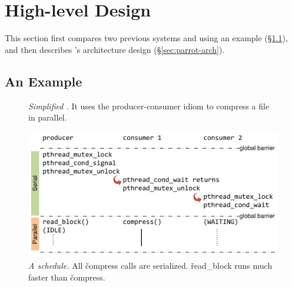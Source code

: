 \section{High-level Design} \label{sec:parrot-design}

This section first compares two previous systems and \parrot using
an example (\S\ref{sec:parrot-example}), and then describes \parrot's architecture design
(\S\ref{sec:parrot-arch}).

\subsection{An Example} \label{sec:parrot-example}

\begin{figure}[!ht]
\vspace{-.1in}
\centering
\begin{minipage}{.5\linewidth}
\tiny {}
\end{minipage}
\vspace{-.1in}
\caption{{\em Simplified \pbzip.} It uses the producer-consumer idiom to
  compress a file in parallel.} \label{fig:parrot-example}
\vspace{-.05in}
\end{figure}

\begin{figure}[t]
\centering
\includegraphics[width=0.6\columnwidth]{parrot/figures/dthreads_schedule}
\vspace{-.2in}
\caption{{\em A \dthreads schedule.}  All
  \v{compress} calls are serialized. \v{read\_block} runs much faster than
  \v{compress}.}\label{fig:parrot-dthreads-schedule}
\vspace{-.05in}
\end{figure}

